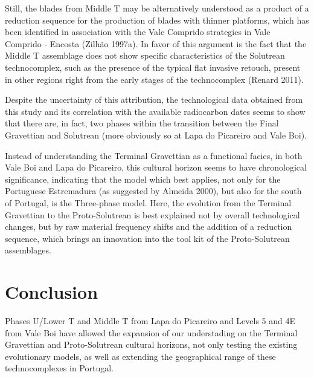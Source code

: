 \documentclass[12pt,twoside]{reedthesis}
\begin{document}
Still, the blades from Middle T may be alternatively understood as a product of a reduction sequence for the production of blades with thinner platforms, which has been identified in association with the Vale Comprido strategies in Vale Comprido - Encosta (Zilhão 1997a). In favor of this argument is the fact that the Middle T assemblage does not show specific characteristics of the Solutrean technocomplex, such as the presence of the typical flat invasive retouch, present in other regions right from the early stages of the technocomplex (Renard 2011).

Despite the uncertainty of this attribution, the technological data obtained from this study and its correlation with the available radiocarbon dates seems to show that there are, in fact, two phases within the transition between the Final Gravettian and Solutrean (more obviously so at Lapa do Picareiro and Vale Boi).

Instead of understanding the Terminal Gravettian as a functional facies, in both Vale Boi and Lapa do Picareiro, this cultural horizon seems to have chronological significance, indicating that the model which best applies, not only for the Portuguese Estremadura (as suggested by Almeida 2000), but also for the south of Portugal, is the Three-phase model. Here, the evolution from the Terminal Gravettian to the Proto-Solutrean is best explained not by overall technological changes, but by raw material frequency shifts and the addition of a reduction sequence, which brings an innovation into the tool kit of the Proto-Solutrean assemblages.

\hypertarget{conclusion}{%
\chapter{Conclusion}\label{conclusion}}

Phases U/Lower T and Middle T from Lapa do Picareiro and Levels 5 and 4E from Vale Boi have allowed the expansion of our understading on the Terminal Gravettian and Proto-Solutrean cultural horizons, not only testing the existing evolutionary models, as well as extending the geographical range of these technocomplexes in Portugal.
\end{document}
